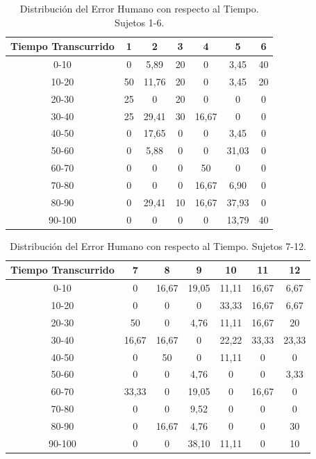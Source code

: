 \begin{table}[H]
\centering
\footnotesize
\begin{tabular}{|c|c|c|c|c|c|c|}
\hline
    Tiempo Transcurrido & 1 & 2 & 3 & 4 & 5 & 6 \\
\hline
0-10    &  0  &   5,89   &   20  &  0       &   3,45   &   40 \\
10-20   &  50 &   11,76  &   20  &  0       &   3,45   &   20 \\
20-30   &  25 &  0       &   20  &  0       &  0       &   0  \\
30-40   &  25 &   29,41  &   30  &   16,67  &  0       &   0  \\
40-50   &  0  &   17,65  &   0   &  0       &   3,45   &   0  \\
50-60   &  0  &   5,88   &   0   &  0       &   31,03  &   0  \\
60-70   &  0  &  0       &   0   &  50      &  0       &   0  \\
70-80   &  0  &  0       &   0   &   16,67  &   6,90   &   0  \\
80-90   &  0  &  29,41   &   10  &   16,67  &   37,93  &   0  \\
90-100  &  0  &  0       &   0   &  0       &   13,79  &   40 \\
\hline
\end{tabular}
\caption{Distribuci\'on del Error Humano con respecto al Tiempo. Sujetos 1-6.}
\label{sec:error-tiempo-1}
\end{table}

\begin{table}[H]
\centering
\footnotesize
\begin{tabular}{|c|c|c|c|c|c|c|}
\hline
    Tiempo Transcurrido & 7 & 8 & 9 & 10 & 11 & 12 \\
\hline
0-10    &  0        &  16,67 &  19,05 &  11,11 &  16,67 &  6,67 \\
10-20   &  0        &  0       &  0       &  33,33 &  16,67 &  6,67 \\
20-30   &  50       &  0       &  4,76  &  11,11 &  16,67 &  20 \\
30-40   &  16,67  &  16,67 &  0       &  22,22 &  33,33 &  23,33 \\
40-50   &  0        &  50      &  0       &  11,11 &  0       &  0 \\
50-60   &  0        &  0       &  4,76  &  0       &  0       &  3,33 \\
60-70   &  33,33  &  0       &  19,05 &  0       &  16,67 &  0 \\
70-80   &  0        &  0       &  9,52  &  0       &  0       &  0 \\
80-90   &  0        &  16,67 &  4,76  &  0       &  0       &  30 \\
90-100  &  0        &  0       &  38,10 &  11,11 &  0       &  10 \\
\hline
\end{tabular}
\caption{Distribuci\'on del Error Humano con respecto al Tiempo. Sujetos 7-12.}
\label{sec:error-tiempo-2}
\end{table}

